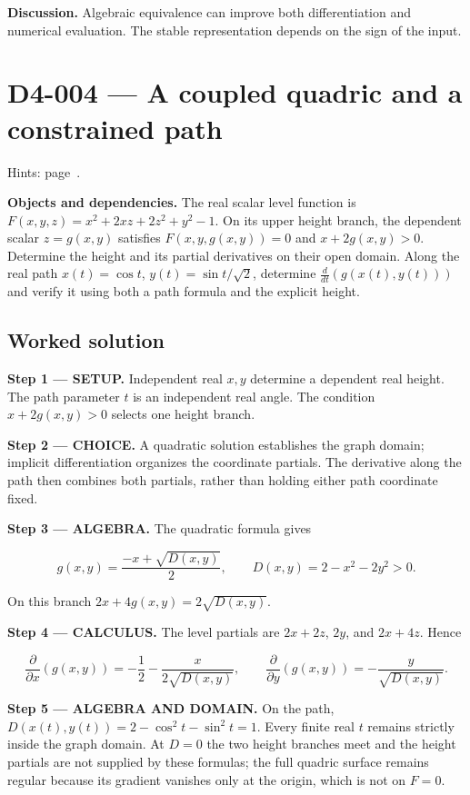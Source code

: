 \documentclass[11pt,oneside,openany]{book}
\begin{document}
\endgroup
\textbf{Discussion.} Algebraic equivalence can improve both differentiation and numerical evaluation. The stable representation depends on the sign of the input.
\clearpage
\section{D4-004 --- A coupled quadric and a constrained path}
\label{problem:D4-004}
{\small Hints: page~\pageref{hints:D4-004}.}\par\medskip

\textbf{Objects and dependencies.} The real scalar level function is \(F(x,y,z)=x^2+2xz+2z^2+y^2-1\). On its upper height branch, the dependent scalar \(z=g(x,y)\) satisfies \(F(x,y,g(x,y))=0\) and \(x+2g(x,y)>0\). Determine the height and its partial derivatives on their open domain. Along the real path \(x(t)=\cos t\), \(y(t)=\sin t/\sqrt2\), determine \(\frac{d}{dt}(g(x(t),y(t)))\) and verify it using both a path formula and the explicit height.
\subsection*{Worked solution}

\textbf{Step 1 --- SETUP.} Independent real \(x,y\) determine a dependent real height. The path parameter \(t\) is an independent real angle. The condition \(x+2g(x,y)>0\) selects one height branch.

\begin{ChoiceStep}
\textbf{Step 2 --- CHOICE.} A quadratic solution establishes the graph domain; implicit differentiation organizes the coordinate partials. The derivative along the path then combines both partials, rather than holding either path coordinate fixed.

\end{ChoiceStep}
\begingroup\color{AlgebraBlue}
\textbf{Step 3 --- ALGEBRA.} The quadratic formula gives

\[
g(x,y)=\frac{-x+\sqrt{D(x,y)}}2,\qquad D(x,y)=2-x^2-2y^2>0.
\]

On this branch \(2x+4g(x,y)=2\sqrt{D(x,y)}\).

\endgroup
\textbf{Step 4 --- CALCULUS.} The level partials are \(2x+2z\), \(2y\), and \(2x+4z\). Hence

\[
\frac{\partial}{\partial x}(g(x,y))=-\frac12-\frac{x}{2\sqrt{D(x,y)}},\qquad
\frac{\partial}{\partial y}(g(x,y))=-\frac{y}{\sqrt{D(x,y)}}.
\]

\begingroup\color{AlgebraBlue}
\textbf{Step 5 --- ALGEBRA AND DOMAIN.} On the path, \(D(x(t),y(t))=2-\cos^2t-\sin^2t=1\). Every finite real \(t\) remains strictly inside the graph domain. At \(D=0\) the two height branches meet and the height partials are not supplied by these formulas; the full quadric surface remains regular because its gradient vanishes only at the origin, which is not on \(F=0\).
\end{document}
